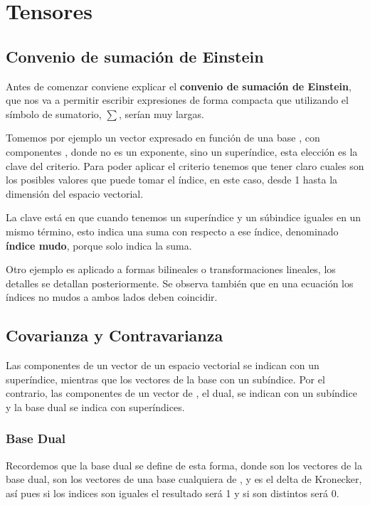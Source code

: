 \section{Tensores}
\subsection{Convenio de sumación de Einstein}
Antes de comenzar conviene explicar el \textbf{convenio de sumación de Einstein}, que nos va a permitir escribir expresiones de forma compacta que utilizando el símbolo de sumatorio, $\sum$, serían muy largas.

Tomemos por ejemplo un vector  expresado en función de una base , con componentes , donde  no es un exponente, sino un superíndice, esta elección es la clave del criterio.
\lrg{\[\bm{v}=\sum_{i=1}^n{v^i \bm{e}_i}=\sum{v^i \bm{e}_i}\equiv v^i \bm{e}_i\]}
Para poder aplicar el criterio tenemos que tener claro cuales son los posibles valores que puede tomar el índice, en este caso, desde 1 hasta la dimensión del espacio vectorial.

La clave está en que cuando tenemos un superíndice y un súbindice iguales en un mismo término, esto indica una suma con respecto a ese índice, denominado \textbf{índice mudo}, porque solo indica la suma.

Otro ejemplo es aplicado a formas bilineales o transformaciones lineales, los detalles se detallan posteriormente.
\lrg{\[\phi(\bm{v},\bm{w})=A_{ij} v^i w^j \;\;\;\;\; {f(\bm{v})}^j={M^j}_i \ v^i\]}
Se observa también que en una ecuación los índices no mudos a ambos lados deben coincidir.
\subsection{Covarianza y Contravarianza}
Las componentes de un vector de un espacio vectorial  se indican con un superíndice, mientras que los vectores de la base con un subíndice. Por el contrario, las componentes de un vector de , el dual, se indican con un subíndice y la base dual se indica con superíndices.
\subsubsection{Base Dual}
\vspace{-25pt}
Recordemos que la base dual se define de esta forma, donde  son los vectores de la base dual,  son los vectores de una base cualquiera de , y  es el delta de Kronecker, así pues si los indices son iguales el resultado será 1 y si son distintos será 0.
